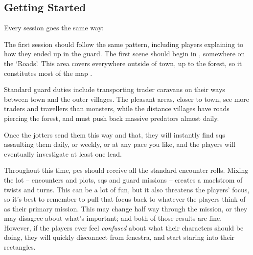 \begin{multicols}{2}


\end{multicols}

\label{sqList}

\needspace{12em}
\begin{multicols}{2}

\subsection{Getting Started}

Every session goes the same way:



The first session should follow the same pattern, including players explaining to  how they ended up in the \gls{guard}.
The first scene should begin in , somewhere on the `Roads'.
This area covers everywhere outside of \gls{town}, up to the forest, so it constitutes most of the map .

Standard \gls{guard} duties%
include transporting trader caravans on their ways between \gls{town} and the outer \glspl{village}.
The pleasant areas, closer to \gls{town}, see more traders and travellers than monsters, while the distance \glspl{village} have roads piercing the forest, and must push back massive predators almost daily.

Once the \glspl{jotter} send them this way and that, they will instantly find \glspl{sq} assaulting them daily, or weekly, or at any pace you like, and the players will eventually investigate at least one lead.

Throughout this time, \glspl{pc} should receive all the standard encounter rolls.
Mixing the lot -- encounters and plots, \glspl{sq} and \gls{guard} missions -- creates a maelstrom of twists and turns.
This can be a lot of fun, but it also threatens the players' focus, so it's best to remember to pull that focus back to whatever the players think of as their primary mission.
This may change half way through the mission, or they may disagree about what's important; and both of those results are fine.
However, if the players ever feel \emph{confused} about what their characters should be doing, they will quickly disconnect from \gls{fenestra}, and start staring into their rectangles.


\end{multicols}
